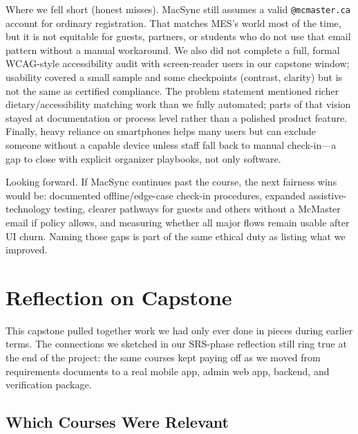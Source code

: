 \documentclass{article}
\begin{document}
Where we fell short (honest misses). MacSync still assumes a valid
\texttt{@mcmaster.ca} account for ordinary registration. That matches MES's
world most of the time, but it is not equitable for guests, partners, or
students who do not use that email pattern without a manual workaround. We also
did not complete a full, formal WCAG-style accessibility audit with
screen-reader users in our capstone window; usability covered a small sample and
some checkpoints (contrast, clarity) but is not the same as certified compliance.
The problem statement mentioned richer dietary/accessibility matching
work than we fully automated; parts of that vision stayed at documentation or
process level rather than a polished product feature. Finally, heavy reliance on
smartphones helps many users but can exclude someone without a capable
device unless staff fall back to manual check-in---a gap to close with explicit
organizer playbooks, not only software.

Looking forward. If MacSync continues past the course, the next fairness
wins would be: documented offline/edge-case check-in procedures,
expanded assistive-technology testing, clearer pathways for
guests and others without a McMaster email if policy allows, and
measuring whether all major flows
remain usable after UI churn. Naming those gaps is part of the same ethical duty
as listing what we improved.

\section{Reflection on Capstone}

This capstone pulled together work we had only ever done in pieces during earlier
terms. The connections we sketched in our SRS-phase reflection
 still ring true at the end of the project: the
same courses kept paying off as we moved from requirements documents to a real
mobile app, admin web app, backend, and verification package.

\subsection{Which Courses Were Relevant}
\end{document}
